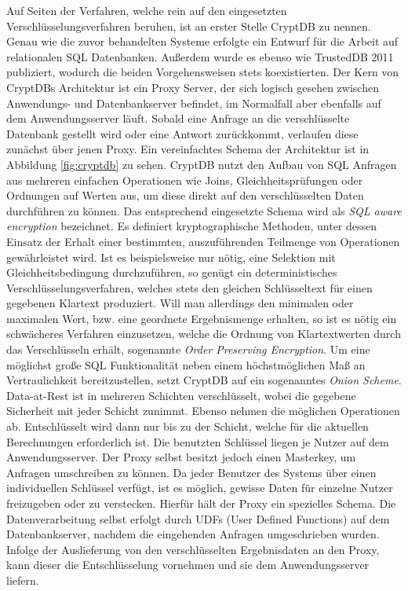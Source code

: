 Auf Seiten der Verfahren, welche rein auf den eingesetzten Verschlüsselungsverfahren beruhen, ist an erster Stelle CryptDB \cite{Popa2011}\cite{Popa2012} zu nennen. Genau wie die zuvor behandelten Systeme erfolgte ein Entwurf für die Arbeit auf relationalen SQL Datenbanken. Außerdem wurde es ebenso wie TrustedDB 2011 publiziert, wodurch die beiden Vorgehensweisen stets koexistierten. Der Kern von CryptDBs Architektur ist ein Proxy Server, der sich logisch gesehen zwischen Anwendungs- und Datenbankserver befindet, im Normalfall aber ebenfalls auf dem Anwendungsserver läuft.  Sobald eine Anfrage an die verschlüsselte Datenbank gestellt wird oder eine Antwort zurückkommt, verlaufen diese zunächst über jenen Proxy. Ein vereinfachtes Schema der Architektur ist in Abbildung \ref{fig:cryptdb} zu sehen. CryptDB nutzt den Aufbau von SQL Anfragen aus mehreren einfachen Operationen wie Joins, Gleichheitsprüfungen oder Ordnungen auf Werten aus, um diese direkt auf den verschlüsselten Daten durchführen zu können. Das entsprechend eingesetzte Schema wird als \textit{SQL aware encryption} bezeichnet. Es definiert kryptographische Methoden, unter dessen Einsatz der Erhalt einer bestimmten, auszuführenden Teilmenge von Operationen gewährleistet wird. Ist es beispielsweise nur nötig, eine Selektion mit Gleichheitsbedingung durchzuführen, so genügt ein deterministisches Verschlüsselungsverfahren, welches stets den gleichen Schlüsseltext für einen gegebenen Klartext produziert. Will man allerdings den minimalen oder maximalen Wert, bzw. eine geordnete Ergebnismenge erhalten, so ist es nötig ein schwächeres Verfahren einzusetzen, welche die Ordnung von Klartextwerten durch das Verschlüsseln erhält, sogenannte \textit{Order Preserving Encryption}. Um eine möglichst große SQL Funktionalität neben einem höchstmöglichen Maß an Vertraulichkeit bereitzustellen, setzt CryptDB auf ein sogenanntes \textit{Onion Scheme}. Data-at-Rest ist in mehreren Schichten verschlüsselt, wobei die gegebene Sicherheit mit jeder Schicht zunimmt. Ebenso nehmen die möglichen Operationen ab. Entschlüsselt wird dann nur bis zu der Schicht, welche für die aktuellen Berechnungen erforderlich ist. Die benutzten Schlüssel liegen je Nutzer auf dem Anwendungsserver. Der Proxy selbst besitzt jedoch einen Masterkey, um Anfragen umschreiben zu können. Da jeder Benutzer des Systems über einen individuellen Schlüssel verfügt, ist es möglich, gewisse Daten für einzelne Nutzer freizugeben oder zu verstecken. Hierfür hält der Proxy ein spezielles Schema. Die Datenverarbeitung selbst erfolgt durch UDFs (User Defined Functions) auf dem Datenbankserver, nachdem die eingehenden Anfragen umgeschrieben wurden. Infolge der Auslieferung von den verschlüsselten Ergebnisdaten an den Proxy, kann dieser die Entschlüsselung vornehmen und sie dem Anwendungsserver liefern.

